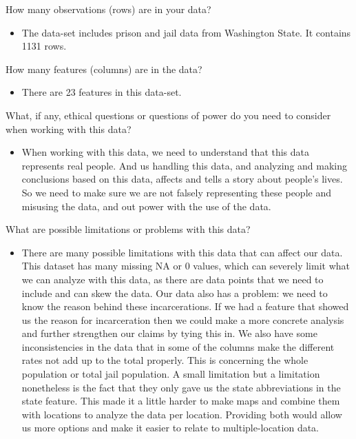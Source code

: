 \documentclass[
]{article}
\providecommand{\tightlist}{%
  \setlength{\itemsep}{0pt}\setlength{\parskip}{0pt}}
\begin{document}
How many observations (rows) are in your data?

\begin{itemize}
\tightlist
\item
  The data-set includes prison and jail data from Washington State. It
  contains 1131 rows.
\end{itemize}

How many features (columns) are in the data?

\begin{itemize}
\tightlist
\item
  There are 23 features in this data-set.
\end{itemize}

What, if any, ethical questions or questions of power do you need to
consider when working with this data?

\begin{itemize}
\tightlist
\item
  When working with this data, we need to understand that this data
  represents real people. And us handling this data, and analyzing and
  making conclusions based on this data, affects and tells a story about
  people's lives. So we need to make sure we are not falsely
  representing these people and misusing the data, and out power with
  the use of the data.
\end{itemize}

What are possible limitations or problems with this data?

\begin{itemize}
\tightlist
\item
  There are many possible limitations with this data that can affect our
  data. This dataset has many missing NA or 0 values, which can severely
  limit what we can analyze with this data, as there are data points
  that we need to include and can skew the data. Our data also has a
  problem: we need to know the reason behind these incarcerations. If we
  had a feature that showed us the reason for incarceration then we
  could make a more concrete analysis and further strengthen our claims
  by tying this in. We also have some inconsistencies in the data that
  in some of the columns make the different rates not add up to the
  total properly. This is concerning the whole population or total jail
  population. A small limitation but a limitation nonetheless is the
  fact that they only gave us the state abbreviations in the state
  feature. This made it a little harder to make maps and combine them
  with locations to analyze the data per location. Providing both would
  allow us more options and make it easier to relate to
  multiple-location data.
\end{itemize}
\end{document}

